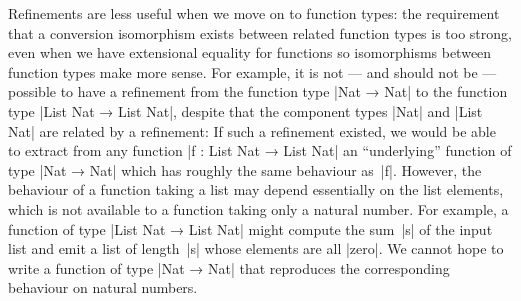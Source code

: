 Refinements are less useful when we move on to function types: the requirement that a conversion isomorphism exists between related function types is too strong, even when we have extensional equality for functions so isomorphisms between function types make more sense.
For example, it is not --- and should not be --- possible to have a refinement from the function type |Nat → Nat| to the function type |List Nat → List Nat|, despite that the component types |Nat| and |List Nat| are related by a refinement:
If such a refinement existed, we would be able to extract from any function |f : List Nat → List Nat| an ``underlying'' function of type |Nat → Nat| which has roughly the same behaviour as~|f|.
However, the behaviour of a function taking a list may depend essentially on the list elements, which is not available to a function taking only a natural number.
For example, a function of type |List Nat → List Nat| might compute the sum~|s| of the input list and emit a list of length~|s| whose elements are all |zero|.
We cannot hope to write a function of type |Nat → Nat| that reproduces the corresponding behaviour on natural numbers.


